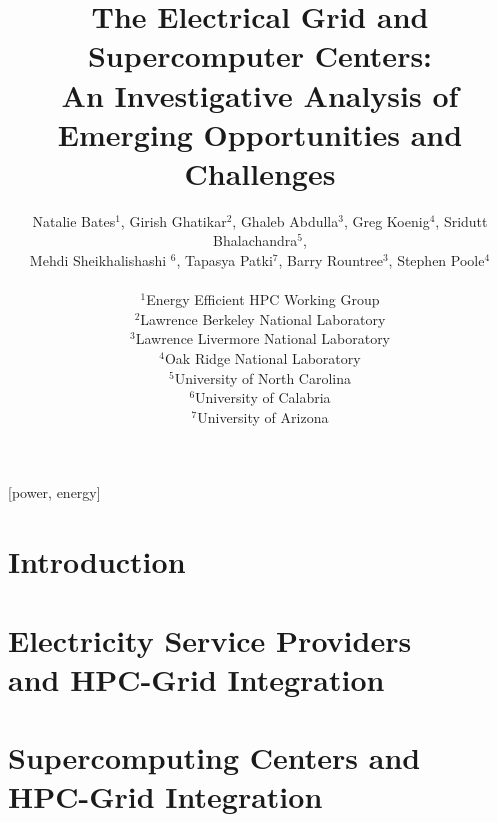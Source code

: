 \documentclass{../style/sig-alternate}
\begin{document}
%

\title{
The Electrical Grid and Supercomputer Centers:\\
An Investigative Analysis of Emerging Opportunities and Challenges
}

\author{Natalie Bates$^1$, Girish Ghatikar$^2$,
  Ghaleb Abdulla$^3$, Greg Koenig$^4$, Sridutt Bhalachandra$^5$, \\
	Mehdi Sheikhalishashi $^6$, Tapasya Patki$^7$, Barry Rountree$^3$, Stephen Poole$^4$
	\\ \\
	$^1$Energy Efficient HPC Working Group\\
       $^2$Lawrence Berkeley National Laboratory\\
       $^3$Lawrence Livermore National Laboratory\\
			 $^4$Oak Ridge National Laboratory\\
			 $^5$University of North Carolina\\
			$^6$University of Calabria\\
			$^7$University of Arizona
	}

\maketitle              %


[power, energy]



%
\section{Introduction}
\label{sec:intro}


\section{Electricity Service Providers\\
 and HPC-Grid Integration}
\label{sec:ESPintegration}


\section{Supercomputing Centers and \\ HPC-Grid Integration}
\label{sec:supercomputercenters}

\end{document}

